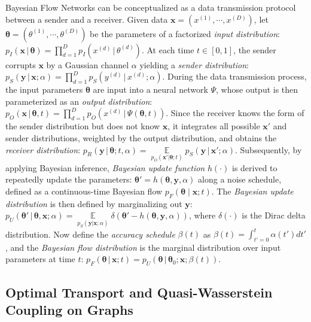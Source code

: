 \documentclass[journal,twoside,web]{ieeecolor}
\begin{document}
Bayesian Flow Networks can be conceptualized as a data transmission protocol between a sender and a receiver. Given data $\mathbf{x}=(x^{(1)}, \cdots, x^{(D)})$, let $\boldsymbol{\theta}=(\theta^{(1)}, \cdots, \theta^{(D)})$ be the parameters of a factorized \emph{input distribution}: $p_I(\mathbf{x}\,|\,\boldsymbol{\theta})=\prod_{d=1}^{D}p_I(x^{(d)}\,|\,\theta^{(d)})$. At each time $t \in [0,1]$, the sender corrupts $\mathbf{x}$ by a Gaussian channel $\alpha$ yielding a \emph{sender distribution}: $p_S(\mathbf{y}\,|\,\mathbf{x};\alpha)=\prod_{d=1}^{D}p_S(y^{(d)}\,|\,x^{(d)};\alpha)$. During the data transmission process, the input parameters $\boldsymbol{\theta}$ are input into a neural network $\Psi$, whose output is then parameterized as an \emph{output distribution}: $p_O(\mathbf{x}\,|\,\boldsymbol{\theta},t)=\prod_{d=1}^{D}p_O(x^{(d)}\,|\,\Psi(\boldsymbol{\theta},t))$. Since the receiver knows the form of the sender distribution but does not know $\mathbf{x}$, it integrates all possible $\mathbf{x}'$ and sender distributions, weighted by the output distribution, and obtains the \emph{receiver distribution}: $p_R(\mathbf{y}\,|\,\boldsymbol{\theta};t, \alpha)=\mathop{\mathbb{E}}\limits_{p_O(\mathbf{x}'|\boldsymbol{\theta};t)}p_S(\mathbf{y}\,|\,\mathbf{x}';\alpha)$. Subsequently, by applying Bayesian inference, \emph{Bayesian update function} $h(\cdot)$ is derived to repeatedly update the parameters: $\boldsymbol{\theta}' = h(\boldsymbol{\theta},\mathbf{y},\alpha)$ along a noise schedule, defined as a continuous-time Bayesian flow $p_F(\boldsymbol{\theta} \mid \mathbf{x};t)$. The \emph{Bayesian update distribution} is then defined by marginalizing out $\mathbf{y}$: $p_U(\boldsymbol{\theta}'\,|\,\boldsymbol{\theta},\mathbf{x};\alpha)=\mathop{\mathbb{E}}\limits_{p_S(\mathbf{y}|\mathbf{x};\alpha)}\delta(\boldsymbol{\theta}'-h(\boldsymbol{\theta},\mathbf{y},\alpha))$, where $\delta(\cdot)$ is the Dirac delta distribution. Now define the \emph{accuracy schedule} $\beta(t)$ as $\beta(t)=\int_{t'=0}^{t}\alpha(t')dt'$, and the \emph{Bayesian flow distribution} is the marginal distribution over input parameters at time $t$: $p_F(\boldsymbol{\theta}\,|\,\mathbf{x};t)=p_U(\boldsymbol{\theta}\,|\,\boldsymbol{\theta}_0;\mathbf{x};\beta(t))$.

\subsection{Optimal Transport and Quasi-Wasserstein Coupling on Graphs}
\label{sec:prelim_ot}
\end{document}
